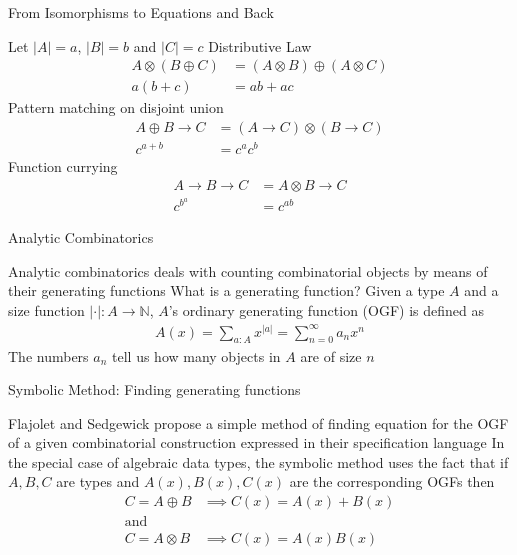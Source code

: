 \documentclass[pdf]{beamer}
\begin{document}
\begin{frame}{From Isomorphisms to Equations and Back}
  \begin{outline}
    \1 Let $|A| = a$, $|B| = b$ and $|C| = c$
    \1 Distributive Law
    \begin{align*}
      A \otimes (B \oplus C) &= (A \otimes B) \oplus (A \otimes C) \\
      a(b+c) &= a b + a c
    \end{align*}
    \1 Pattern matching on disjoint union
    \begin{align*}
      A \oplus B \to C &= (A \to C) \otimes (B \to C) \\
      c^{a+b} &= c^{a} c^{b}
    \end{align*}
    \1 Function currying
    \begin{align*}
      A \to B \to C &= A \otimes B \to C \\
      c^{b^{a}} &= c^{a b}
    \end{align*}
  \end{outline}
\end{frame}

\begin{frame}{Analytic Combinatorics}
  \begin{outline}
    \1 Analytic combinatorics deals with counting combinatorial objects by means of their generating functions
    \1 What is a generating function?
    \1 Given a type $A$ and a size function $|\cdot| : A \to \mathbb{N}$, $A$'s ordinary generating function (OGF) is defined as
    \begin{align*}
      A(x) = \sum_{a : A}{x^{|a|}} = \sum_{n=0}^{\infty}{a_n x^n}
    \end{align*}
    \1 The numbers $a_n$ tell us how many objects in $A$ are of size $n$
  \end{outline}
\end{frame}

\begin{frame}[fragile]{Symbolic Method: Finding generating functions}
  \begin{outline}
    \1 Flajolet and Sedgewick propose a simple method of finding equation for the OGF of a given combinatorial construction expressed in their specification language
    \1 In the special case of algebraic data types, the symbolic method uses the fact that if $A, B, C$ are types and $A(x), B(x), C(x)$ are the corresponding OGFs then
    \begin{align*}
      C = A \oplus B &\implies C(x) = A(x) + B(x) \\
    \text{and} \\
      C = A \otimes B &\implies C(x) = A(x) B(x)
    \end{align*}
  \end{outline}
\end{frame}
\end{document}
